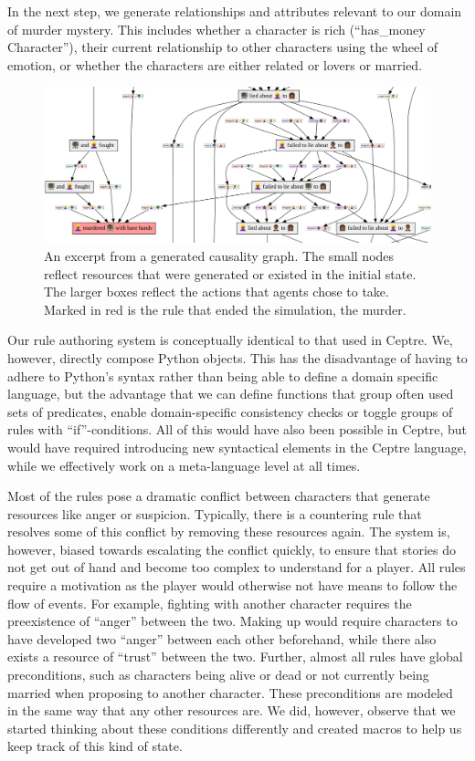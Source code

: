 In the next step, we generate relationships and attributes relevant to our domain of murder mystery. This includes whether a character is rich (\enquote{has\_money Character}), their current relationship to other characters using the wheel of emotion, or whether the characters are either related or lovers or married.

\begin{figure}
  \includegraphics[width=\textwidth]{graph.png}
  \caption{An excerpt from a generated causality graph. The small nodes reflect resources that were generated or existed in the initial state. The larger boxes reflect the actions that agents chose to take. Marked in red is the rule that ended the simulation, the murder.}
\end{figure}

Our rule authoring system is conceptually identical to that used in Ceptre.
We, however, directly compose Python objects.
This has the disadvantage of having to adhere to Python's syntax rather than being able to define a domain specific language, but the advantage that we can define functions that group often used sets of predicates, enable domain-specific consistency checks or toggle groups of rules with \enquote{if}-conditions.
All of this would have also been possible in Ceptre, but would have required introducing new syntactical elements in the Ceptre language, while we effectively work on a meta-language level at all times.

Most of the rules pose a dramatic conflict between characters that generate resources like anger or suspicion.
Typically, there is a countering rule that resolves some of this conflict by removing these resources again.
The system is, however, biased towards escalating the conflict quickly, to ensure that stories do not get out of hand and become too complex to understand for a player.
All rules require a motivation as the player would otherwise not have means to follow the flow of events.
For example, fighting with another character requires the preexistence of \enquote{anger} between the two.
Making up would require characters to have developed two \enquote{anger} between each other beforehand, while there also exists a resource of \enquote{trust} between the two.
Further, almost all rules have global preconditions, such as characters being alive or dead or not currently being married when proposing to another character.
These preconditions are modeled in the same way that any other resources are.
We did, however, observe that we started thinking about these conditions differently and created macros to help us keep track of this kind of state.

